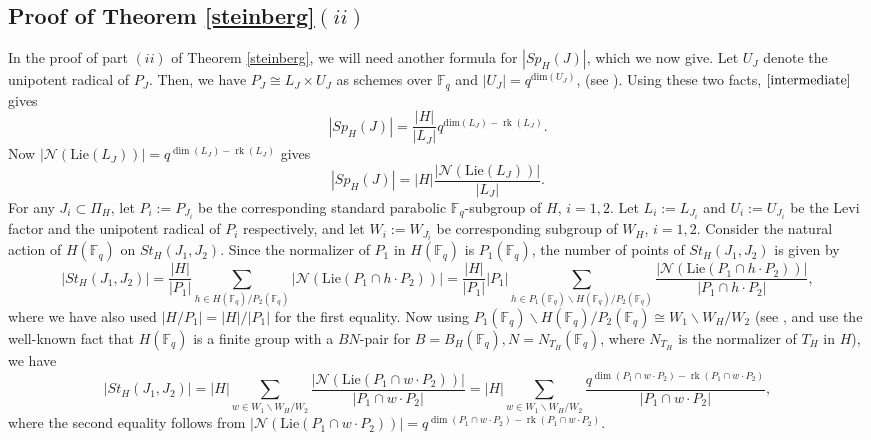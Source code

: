 \documentclass{amsart}
\theoremstyle{plain}
\theoremstyle{definition}
\theoremstyle{remark}
\DeclareMathOperator{\rk}{rk}
\begin{document}
\subsection{Proof of Theorem \ref{steinberg}$(ii)$}
In the proof of part $(ii)$ of Theorem \ref{steinberg}, we will need another formula for $|Sp_{H}(J)|$, which we now give. Let $U_J$ denote the unipotent radical of $P_J$. Then, we have $P_J\cong L_J\times U_J$ as schemes over $\mathbb{F}_{q}$ and $|U_J|=q^{\text{dim}(U_J)}$, (see \cite[Corollary 14.2.7]{Spr}). Using these two facts, $\eqref{intermediate}$ gives
\begin{equation}\label{for GLn}
|Sp_{H}(J)|=\frac{|H|}{|L_{J}|} q^{\text{dim}(L_{J})-\rk(L_{J})}.
\end{equation}
Now $|\mathcal{N}(\text{Lie}(L_J))|=q^{\dim(L_{J})-\rk(L_{J})}$ gives
\begin{equation}\label{levi1}
    |Sp_{H}(J)|=|H| \frac{|\mathcal{N}(\text{Lie}(L_J))|}{|L_J|}.
\end{equation}
For any $J_{i}\subset \Pi_H$, let $P_i:=P_{J_{i}}$ be the corresponding standard parabolic $\mathbb{F}_{q}$-subgroup of $H$, $i=1,2$. Let $L_{i}:=L_{J_{i}}$ and $U_{i}:=U_{J_{i}}$ be the Levi factor and the unipotent radical of $P_{i}$ respectively, and let $W_i:=W_{J_{i}}$ be corresponding subgroup of $W_H$, $i=1,2$. Consider the natural action of $H(\mathbb{F}_{q})$ on $St_{H}(J_1,J_2)$. Since the normalizer of $P_{1}$ in $H(\mathbb{F}_{q})$ is $P_{1}(\mathbb{F}_{q})$, the number of points of $St_{H}(J_1,J_2)$ is given by
\[
|St_{H}(J_1,J_2)|=\frac{|H|}{|P_{1}|}\sum_{h\in H(\mathbb{F}_{q})/P_2(\mathbb{F}_{q})}|\mathcal{N}(\text{Lie}(P_1\cap h\cdot P_2))|
=\frac{|H|}{|P_{1}|}|P_1|\sum_{h\in P_{1}(\mathbb{F}_{q})\backslash H(\mathbb{F}_{q})/P_2(\mathbb{F}_{q})}\frac{|\mathcal{N}(\text{Lie}(P_1\cap h\cdot P_2))|}{|P_{1}\cap h\cdot P_2|},
\]
where we have also used $|H/P_{1}|=|H|/|P_{1}|$ for the first equality. Now using $P_{1}(\mathbb{F}_{q})\backslash H(\mathbb{F}_{q})/P_2(\mathbb{F}_{q})\cong W_{1}\backslash W_{H}/W_2$ (see \cite[Theorem 65.21]{CR} , \cite[Theorem 21.91]{Mil1} and use the well-known fact that $H(\mathbb{F}_{q})$ is a finite group with a $BN$-pair \cite[Proposition 21.75]{Mil1} for $B=B_{H}(\mathbb{F}_{q}), N=N_{T_{H}}(\mathbb{F}_{q})$, where $N_{T_{H}}$ is the normalizer of $T_H$ in $H$), we have
\[
|St_{H}(J_1,J_2)|
=
|H|\sum_{w\in W_{1}\backslash W_{H}/W_{2}}\frac{|\mathcal{N}(\text{Lie}(P_1\cap w\cdot P_2))|}{|P_{1}\cap w\cdot P_2|}=|H|\sum_{w\in W_{1}\backslash W_{H}/W_2}\frac{q^{\dim(P_1\cap w\cdot P_2)-\rk(P_1\cap w\cdot P_2)}}{|P_{1}\cap w\cdot P_2|},
\]
where the second equality follows from $|\mathcal{N}(\text{Lie}(P_{1}\cap w\cdot P_{2}))|=q^{\dim(P_{1}\cap w\cdot P_{2})-\rk(P_{1}\cap w\cdot P_{2})}$.
\end{document}
